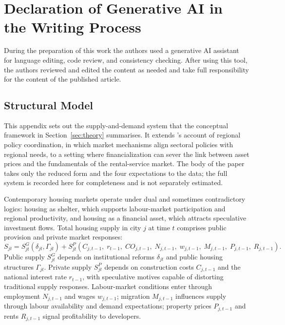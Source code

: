\documentclass[preprint,11pt,authoryear]{elsarticle}
\begin{document}
\section*{Declaration of Generative AI in the Writing Process}
During the preparation of this work the authors used a generative AI
assistant for language editing, code review, and consistency checking.
After using this tool, the authors reviewed and edited the content as
needed and take full responsibility for the content of the published
article.



\begin{appendices}
\section{Structural Model}
\label{sec:model}

This appendix sets out the supply-and-demand system that the conceptual
framework in Section~\ref{sec:theory} summarises. It extends
\citet{kuklinski1970regional}'s account of regional policy coordination,
in which market mechanisms align sectoral policies with regional needs,
to a setting where financialization can sever the link between asset
prices and the fundamentals of the rental-service market. The body of the
paper takes only the reduced form and the four expectations to the data;
the full system is recorded here for completeness and is not separately
estimated.

Contemporary housing markets operate under dual and sometimes
contradictory logics: housing as shelter, which supports labour-market
participation and regional productivity, and housing as a financial
asset, which attracts speculative investment flows. Total housing supply
in city $j$ at time $t$ comprises public provision and private market
responses:
\begin{equation}
\label{eq:supply}
S_{jt} = S^G_{jt}(\delta_{jt}, \Gamma_{jt})
+ S^P_{jt}(C_{j,t-1},\; r_{t-1},\; CO_{j,t-1},\;
N_{j,t-1},\; w_{j,t-1},\; M_{j,t-1},\;
P_{j,t-1},\; R_{j,t-1}).
\end{equation}
Public supply $S^G_{jt}$ depends on institutional reforms $\delta_{jt}$
and public housing structures $\Gamma_{jt}$. Private supply $S^P_{jt}$
depends on construction costs $C_{j,t-1}$ and the national interest rate
$r_{t-1}$, with speculative motives capable of distorting traditional
supply responses. Labour-market conditions enter through employment
$N_{j,t-1}$ and wages $w_{j,t-1}$; migration $M_{j,t-1}$ influences supply
through labour availability and demand expectations; property prices
$P_{j,t-1}$ and rents $R_{j,t-1}$ signal profitability to developers.


\end{appendices}
\end{document}
